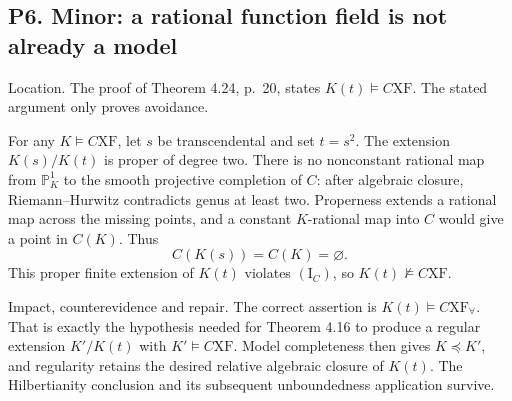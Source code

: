 \documentclass[10pt]{article}
\begin{document}
\subsection*{P6. Minor: a rational function field is not already a model}
Location. The proof of Theorem 4.24, p. 20, states \(K(t)\models C\mathrm{XF}\). The stated argument only proves avoidance.\par
For any \(K\models C\mathrm{XF}\), let \(s\) be transcendental and set \(t=s^2\). The extension \(K(s)/K(t)\) is proper of degree two. There is no nonconstant rational map from \(\mathbb P^1_K\) to the smooth projective completion of \(C\): after algebraic closure, Riemann–Hurwitz contradicts genus at least two. Properness extends a rational map across the missing points, and a constant \(K\)-rational map into \(C\) would give a point in \(C(K)\). Thus \[C(K(s))=C(K)=\varnothing .\] This proper finite extension of \(K(t)\) violates \((\mathrm I_C)\), so \(K(t)\not\models C\mathrm{XF}\).\par
Impact, counterevidence and repair. The correct assertion is \(K(t)\models C\mathrm{XF}_\forall\). That is exactly the hypothesis needed for Theorem 4.16 to produce a regular extension \(K'/K(t)\) with \(K'\models C\mathrm{XF}\). Model completeness then gives \(K\preccurlyeq K'\), and regularity retains the desired relative algebraic closure of \(K(t)\). The Hilbertianity conclusion and its subsequent unboundedness application survive.\par
\end{document}
